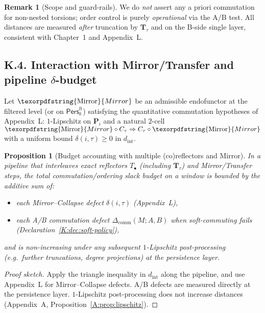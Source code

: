 \documentclass[11pt]{article}
\DeclareRobustCommand{\hyp}{\nobreakdash-}
\newcommand{\Pers}{\mathsf{Pers}}
\numberwithin{equation}{section}
\newtheorem{proposition}[theorem]{Proposition}
\theoremstyle{definition}
\newtheorem{remark}[theorem]{Remark}
\DeclareRobustCommand{\Mirror}{\texorpdfstring{\ensuremath{\operatorname{Mirror}}}{Mirror}}
\begin{document}
\begin{remark}[Scope and guard\hyp rails]
We do \emph{not} assert any a priori commutation for non\hyp nested torsions; order control is purely \emph{operational} via the A/B test. All distances are measured \emph{after} truncation by \(\mathbf{T}_\tau\) and on the B\hyp side single layer, consistent with Chapter~1 and Appendix~L.
\end{remark}

\subsection*{K.4. Interaction with Mirror/Transfer and pipeline $\delta$-budget}
Let \(\Mirror\) be an admissible endofunctor at the filtered level (or on \(\Pers^{\mathrm{ft}}_k\)) satisfying the quantitative commutation hypotheses of Appendix~L: \(1\)\hyp Lipschitz on \(\mathbf{P}_i\) and a natural \(2\)\hyp cell \(\Mirror\circ C_\tau \Rightarrow C_\tau\circ \Mirror\) with a uniform bound \(\delta(i,\tau)\ge 0\) in \(d_{\mathrm{int}}\).

\begin{proposition}[Budget accounting with multiple (co)reflectors and Mirror]\label{K:prop:budget}
In a pipeline that interleaves exact reflectors \(T_\bullet\) (including \(\mathbf{T}_\tau\)) and Mirror/Transfer steps, the total commutation/ordering slack budget on a window is bounded by the \emph{additive} sum of:
\begin{itemize}\itemsep0.2em
  \item each Mirror–Collapse defect \(\delta(i,\tau)\) (Appendix~L),
  \item each A/B commutation defect \(\Delta_{\mathrm{comm}}(M;A,B)\) when soft\hyp commuting fails (Declaration~\ref{K:dec:soft-policy}),
\end{itemize}
and is \emph{non\hyp increasing} under any subsequent \(1\)\hyp Lipschitz post\hyp processing (e.g.\ further truncations, degree projections) at the persistence layer.
\end{proposition}

\begin{proof}[Proof sketch]
Apply the triangle inequality in \(d_{\mathrm{int}}\) along the pipeline, and use Appendix~L for Mirror–Collapse defects. A/B defects are measured directly at the persistence layer. \(1\)\hyp Lipschitz post\hyp processing does not increase distances (Appendix~A, Proposition~\ref{A:prop:lipschitz}).
\end{proof}
\end{document}
